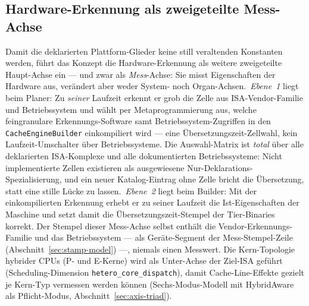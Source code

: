 \begin{nurlang}
\subsection{Hardware-Erkennung als zweigeteilte Mess-Achse}\label{sec:hw-probe}
Damit die deklarierten Plattform-Glieder keine still veraltenden Konstanten werden, führt das
Konzept die Hardware-Erkennung als weitere zweigeteilte Haupt-Achse ein --- und zwar als
\emph{Mess}-Achse: Sie misst Eigenschaften der Hardware aus, verändert aber weder System- noch
Organ-Achsen.\ \emph{Ebene~1} liegt beim Planer: Zu \emph{seiner} Laufzeit erkennt er grob die Zelle
aus ISA-Vendor-Familie und Betriebssystem und wählt per Metaprogrammierung aus, welche
feingranulare Erkennungs-Software samt Betriebssystem-Zugriffen in den \texttt{CacheEngineBuilder}
einkompiliert wird --- eine Übersetzungszeit-Zellwahl, kein Laufzeit-Umschalter über
Betriebssysteme. Die Auswahl-Matrix ist \emph{total} über alle deklarierten ISA-Komplexe und alle
dokumentierten Betriebssysteme: Nicht implementierte Zellen existieren als ausgewiesene
Nur-Deklarations-Spezialisierung, und ein neuer Katalog-Eintrag ohne Zelle bricht die Übersetzung,
statt eine stille Lücke zu lassen.\ \emph{Ebene~2} liegt beim Builder: Mit der einkompilierten
Erkennung erhebt er zu seiner Laufzeit die Ist-Eigenschaften der Maschine und setzt damit die
Übersetzungszeit-Stempel der Tier-Binaries korrekt. Der Stempel dieser Mess-Achse selbst enthält die
Vendor-Erkennungs-Familie und das Betriebssystem --- als Geräte-Segment der Mess-Stempel-Zeile
(Abschnitt~\ref{sec:stamp-model}) ---, niemals einen Messwert. Die Kern-Topologie hybrider CPUs (P- und
E-Kerne) wird als Unter-Achse der Ziel-ISA geführt (Scheduling-Dimension \texttt{hetero\_core\_dispatch}),
damit Cache-Line-Effekte gezielt je Kern-Typ vermessen werden können (Sechs-Modus-Modell mit
HybridAware als Pflicht-Modus, Abschnitt~\ref{sec:axis-triad}).


\end{nurlang}
